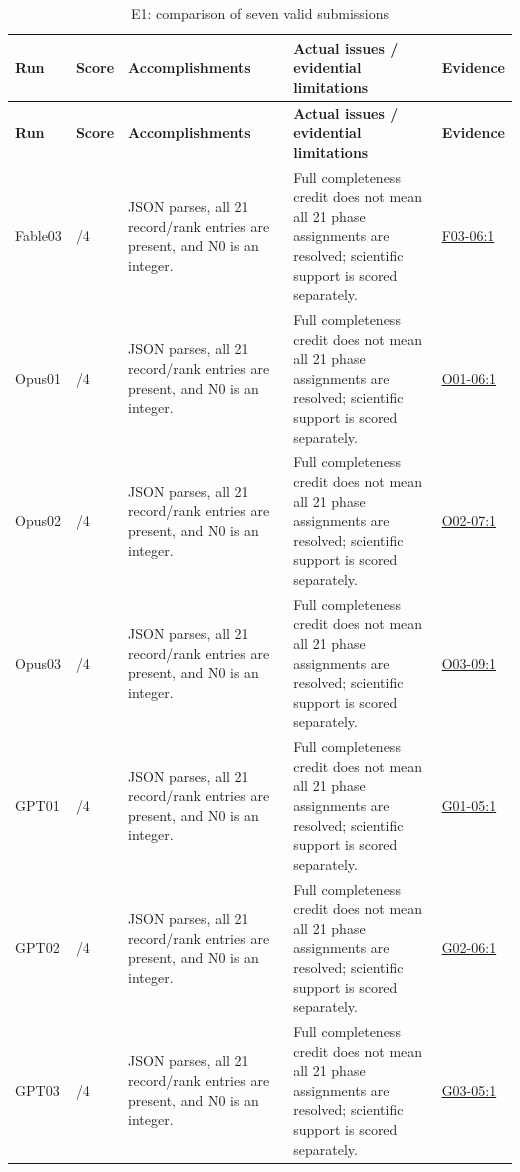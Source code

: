 \documentclass[11pt,a4paper]{article}
\begin{document}
{\fontsize{9.0}{12.6}\selectfont
\setlength{\tabcolsep}{2.5pt}
\begin{longtable}{>{\raggedright\arraybackslash}p{}>{\raggedright\arraybackslash}p{}>{\raggedright\arraybackslash}p{}>{\raggedright\arraybackslash}p{}>{\raggedright\arraybackslash}p{}}
\caption{E1: comparison of seven valid submissions}\\
\toprule
\textbf{Run} & \textbf{Score} & \textbf{Accomplishments} & \textbf{Actual issues /\allowbreak{} evidential limitations} & \textbf{Evidence}\tabularnewline
\midrule
\endfirsthead
\toprule
\textbf{Run} & \textbf{Score} & \textbf{Accomplishments} & \textbf{Actual issues /\allowbreak{} evidential limitations} & \textbf{Evidence}\tabularnewline
\midrule
\endhead
{}Fable03 & 4/\allowbreak{}4 & JSON parses,\allowbreak{} all 21 record/\allowbreak{}rank entries are present,\allowbreak{} and N0 is an integer. & Full completeness credit does not mean all 21 phase assignments are resolved; scientific support is scored separately. & \hyperref[src:F03-06]{F03-06:1}\tabularnewline
{}Opus01 & 4/\allowbreak{}4 & JSON parses,\allowbreak{} all 21 record/\allowbreak{}rank entries are present,\allowbreak{} and N0 is an integer. & Full completeness credit does not mean all 21 phase assignments are resolved; scientific support is scored separately. & \hyperref[src:O01-06]{O01-06:1}\tabularnewline
{}Opus02 & 4/\allowbreak{}4 & JSON parses,\allowbreak{} all 21 record/\allowbreak{}rank entries are present,\allowbreak{} and N0 is an integer. & Full completeness credit does not mean all 21 phase assignments are resolved; scientific support is scored separately. & \hyperref[src:O02-07]{O02-07:1}\tabularnewline
{}Opus03 & 4/\allowbreak{}4 & JSON parses,\allowbreak{} all 21 record/\allowbreak{}rank entries are present,\allowbreak{} and N0 is an integer. & Full completeness credit does not mean all 21 phase assignments are resolved; scientific support is scored separately. & \hyperref[src:O03-09]{O03-09:1}\tabularnewline
{}GPT01 & 4/\allowbreak{}4 & JSON parses,\allowbreak{} all 21 record/\allowbreak{}rank entries are present,\allowbreak{} and N0 is an integer. & Full completeness credit does not mean all 21 phase assignments are resolved; scientific support is scored separately. & \hyperref[src:G01-05]{G01-05:1}\tabularnewline
{}GPT02 & 4/\allowbreak{}4 & JSON parses,\allowbreak{} all 21 record/\allowbreak{}rank entries are present,\allowbreak{} and N0 is an integer. & Full completeness credit does not mean all 21 phase assignments are resolved; scientific support is scored separately. & \hyperref[src:G02-06]{G02-06:1}\tabularnewline
{}GPT03 & 4/\allowbreak{}4 & JSON parses,\allowbreak{} all 21 record/\allowbreak{}rank entries are present,\allowbreak{} and N0 is an integer. & Full completeness credit does not mean all 21 phase assignments are resolved; scientific support is scored separately. & \hyperref[src:G03-05]{G03-05:1}\tabularnewline
\bottomrule
\end{longtable}
}
\end{document}
